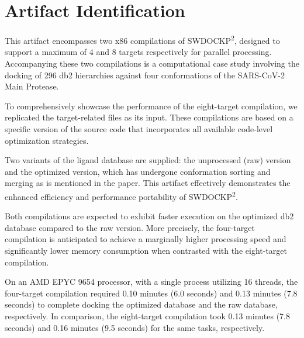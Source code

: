 \documentclass[nonacm,sigconf]{acmart}
\begin{document}
\section{Artifact Identification}


\newartifact

\artrel
This artifact encompasses two x86 compilations of SWDOCKP\textsuperscript{2}, designed to support a maximum of 4 and 8 targets respectively for parallel processing. Accompanying these two compilations is a computational case study involving the docking of 296 db2 hierarchies against four conformations of the SARS-CoV-2 Main Protease.

To comprehensively showcase the performance of the eight-target compilation, we replicated the target-related files as its input. These compilations are based on a specific version of the source code that incorporates all available code-level optimization strategies.

Two variants of the ligand database are supplied: the unprocessed (raw) version and the optimized version, which has undergone conformation sorting and merging as is mentioned in the paper. This artifact effectively demonstrates the enhanced efficiency and performance portability of SWDOCKP\textsuperscript{2}.


\artexp
Both compilations are expected to exhibit faster execution on the optimized db2 database compared to the raw version. More precisely, the four-target compilation is anticipated to achieve a marginally higher processing speed and significantly lower memory consumption when contrasted with the eight-target compilation.



\arttime
On an AMD EPYC 9654 processor, with a single process utilizing 16 threads, the four-target compilation required 0.10 minutes (6.0 seconds) and 0.13 minutes (7.8 seconds) to complete docking the optimized database and the raw database, respectively. In comparison, the eight-target compilation took 0.13 minutes (7.8 seconds) and 0.16 minutes (9.5 seconds) for the same tasks, respectively.
\end{document}
